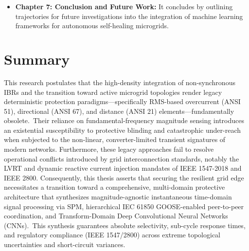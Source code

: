 \begin{itemize}
\item \textbf{Chapter 7: Conclusion and Future Work:} It concludes by outlining trajectories for future investigations into the integration of machine learning frameworks for autonomous self-healing microgrids.
\end{itemize}


\section{Summary}

This research postulates that the high-density integration of non-synchronous IBRs and the transition toward active microgrid topologies render legacy deterministic protection paradigms—specifically RMS-based overcurrent (ANSI 51), directional (ANSI 67), and distance (ANSI 21) elements—fundamentally obsolete.~Their reliance on fundamental-frequency magnitude sensing introduces an existential susceptibility to protective blinding and catastrophic under-reach when subjected to the non-linear, converter-limited transient signatures of modern networks. Furthermore, these legacy approaches fail to resolve operational conflicts introduced by grid interconnection standards, notably the LVRT and dynamic reactive current injection mandates of IEEE 1547-2018 and IEEE 2800. Consequently, this thesis asserts that securing the resilient grid edge necessitates a transition toward a comprehensive, multi-domain protective architecture that synthesizes magnitude-agnostic instantaneous time-domain signal processing via SPM, hierarchical IEC 61850 GOOSE-enabled peer-to-peer coordination, and Transform-Domain Deep Convolutional Neural Networks (CNNs).~This synthesis guarantees absolute selectivity, sub-cycle response times, and regulatory compliance (IEEE 1547/2800) across extreme topological uncertainties and short-circuit variances.

% 










